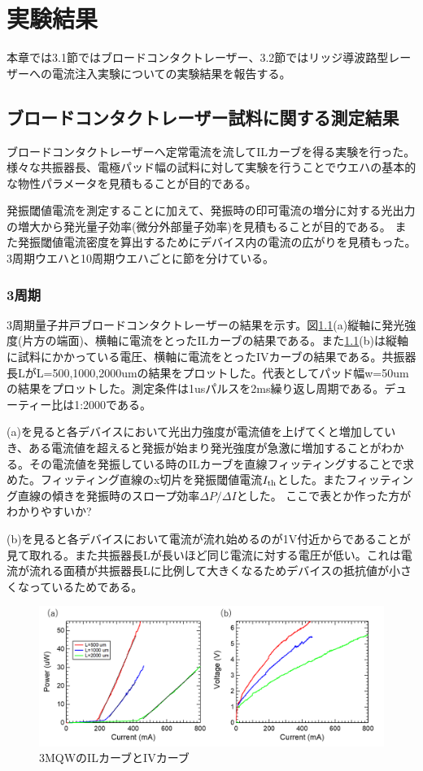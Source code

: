 
\chapter{実験結果}

本章では3.1節ではブロードコンタクトレーザー、3.2節ではリッジ導波路型レーザーへの電流注入実験についての実験結果を報告する。
\section{ブロードコンタクトレーザー試料に関する測定結果}%
ブロードコンタクトレーザーへ定常電流を流してILカーブを得る実験を行った。様々な共振器長、電極パッド幅の試料に対して実験を行うことでウエハの基本的な物性パラメータを見積もることが目的である。

発振閾値電流を測定することに加えて、発振時の印可電流の増分に対する光出力の増大から発光量子効率(微分外部量子効率)を見積もることが目的である。
また発振閾値電流密度を算出するためにデバイス内の電流の広がりを見積もった。
3周期ウエハと10周期ウエハごとに節を分けている。
\subsection{3周期}%
3周期量子井戸ブロードコンタクトレーザーの結果を示す。図\ref{fig:fig_3_1_3QW_broacdcontact_IL}(a)縦軸に発光強度(片方の端面)、横軸に電流をとったILカーブの結果である。また\ref{fig:fig_3_1_3QW_broacdcontact_IL}(b)は縦軸に試料にかかっている電圧、横軸に電流をとったIVカーブの結果である。共振器長LがL=500,1000,2000umの結果をプロットした。代表としてパッド幅w=50umの結果をプロットした。測定条件は1usパルスを2ms繰り返し周期である。デューティー比は1:2000である。

(a)を見ると各デバイスにおいて光出力強度が電流値を上げてくと増加していき、ある電流値を超えると発振が始まり発光強度が急激に増加することがわかる。その電流値を発振している時のILカーブを直線フィッティングすることで求めた。フィッティング直線のx切片を発振閾値電流$I_{\rm{th}}$とした。またフィッティング直線の傾きを発振時のスロープ効率$\Delta P/\Delta I$とした。
ここで表とか作った方がわかりやすいか?

(b)を見ると各デバイスにおいて電流が流れ始めるのが1V付近からであることが見て取れる。また共振器長Lが長いほど同じ電流に対する電圧が低い。これは電流が流れる面積が共振器長Lに比例して大きくなるためデバイスの抵抗値が小さくなっているためである。
\begin{figure}[h]
	\centering
	\includegraphics[width=15cm]{figure/fig_3_1_3QW_broadcontact_IL.png}
		\caption{3MQWのILカーブとIVカーブ}
		\label{fig:fig_3_1_3QW_broacdcontact_IL}
\end{figure}

